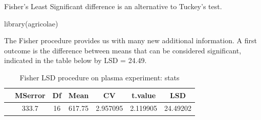 \documentclass[
]{book}
\newenvironment{Shaded}{\begin{snugshade}}{\end{snugshade}}
\newcommand{\AttributeTok}[1]{\textcolor[rgb]{0.77,0.63,0.00}{#1}}
\newcommand{\DecValTok}[1]{\textcolor[rgb]{0.00,0.00,0.81}{#1}}
\newcommand{\FloatTok}[1]{\textcolor[rgb]{0.00,0.00,0.81}{#1}}
\newcommand{\FunctionTok}[1]{\textcolor[rgb]{0.00,0.00,0.00}{#1}}
\newcommand{\NormalTok}[1]{#1}
\newcommand{\OtherTok}[1]{\textcolor[rgb]{0.56,0.35,0.01}{#1}}
\newcommand{\SpecialCharTok}[1]{\textcolor[rgb]{0.00,0.00,0.00}{#1}}
\newcommand{\StringTok}[1]{\textcolor[rgb]{0.31,0.60,0.02}{#1}}
\begin{document}
Fisher's Least Significant difference is an alternative to Tuckey's test.

\begin{Shaded}
\begin{Highlighting}[]
\FunctionTok{library}\NormalTok{(agricolae)}
\end{Highlighting}
\end{Shaded}

\begin{Shaded}
\end{Shaded}

The Fisher procedure provides us with many new additional information. A first outcome is the difference between means that can be considered significant, indicated in the table below by LSD = 24.49.

\begin{Shaded}
\end{Shaded}

\begin{table}

\caption{\label{tab:tab-plasmafisherstatistics}Fisher LSD procedure on plasma experiment: stats}
\centering
\begin{tabular}[t]{lcccccc}
\toprule
  & MSerror & Df & Mean & CV & t.value & LSD\\
\midrule
 & 333.7 & 16 & 617.75 & 2.957095 & 2.119905 & 24.49202\\
\bottomrule
\end{tabular}
\end{table}
\end{document}
